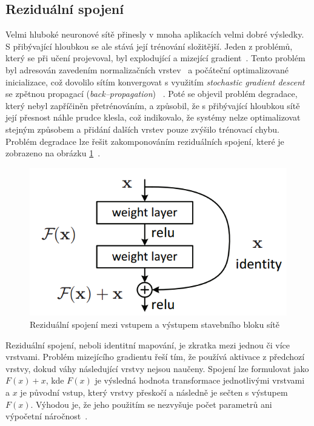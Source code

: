 \subsection{Reziduální spojení}
Velmi hluboké neuronové sítě přinesly v mnoha aplikacích velmi dobré výsledky. S přibývající hloubkou se ale stává její trénování složitější. Jeden z problémů, který se při učení projevoval, byl explodující a mizející gradient~\cite{279181}. Tento problém byl adresován zavedením normalizačních vrstev~\cite{ioffe2015batch} a počáteční optimalizované inicializace, což dovolilo sítím konvergovat s využitím \textit{stochastic gradient descent} se zpětnou propagací (\textit{back--propagation})~ \cite{6795724}. Poté se objevil problém degradace, který nebyl zapříčiněn přetrénováním, a způsobil, že s přibývající hloubkou sítě její přesnost náhle prudce klesla, což indikovalo, že systémy nelze optimalizovat stejným způsobem a přidání dalších vrstev pouze zvýšilo trénovací chybu. Problém degradace lze řešit zakomponováním reziduálních spojení, které je zobrazeno na obrázku \ref{fig:residualconnection}~\cite{he2015deep}.

\begin{figure}[H]
    \centering
    \includegraphics[scale=0.5]{obrazky-figures/residual_connection.png}
    \caption{\label{fig:residualconnection}Reziduální spojení mezi vstupem a výstupem stavebního bloku sítě~\cite{he2015deep}}
\end{figure}

Reziduální spojení, neboli identitní mapování, je zkratka mezi jednou či více vrstvami. Problém mizejícího gradientu řeší tím, že používá aktivace z předchozí vrstvy, dokud váhy následující vrstvy nejsou naučeny. Spojení lze formulovat jako $F(x) + x$, kde $F(x)$ je výsledná hodnota transformace jednotlivými vrstvami a $x$ je původní vstup, který vrstvy přeskočí a následně je sečten s výstupem $F(x)$. Výhodou je, že jeho použitím se nezvyšuje počet parametrů ani výpočetní náročnost~\cite{he2015deep}\cite{zaeemzadeh2018normpreservation}.



